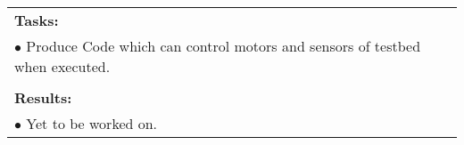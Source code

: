 \begin{table}[!h]
\begin{center}
\begin{tabular}{|p{}||p{}|p{}||p{}|}
            \multicolumn{4}{|p{.95\columnwidth}|}{\textbf{Tasks:}}\\
            \multicolumn{4}{|p{.95\columnwidth}|}{$\bullet$ Produce Code which can control motors and sensors of testbed when executed.}\\
            \multicolumn{4}{|p{.95\columnwidth}|}{}\\
            \multicolumn{4}{|p{.95\columnwidth}|}{\textbf{Results:}}\\
            \multicolumn{4}{|p{.95\columnwidth}|}{$\bullet$ Yet to be worked on.}\\
            \hline
        \end{tabular}
    \end{center}
\end{table}

\clearpage

